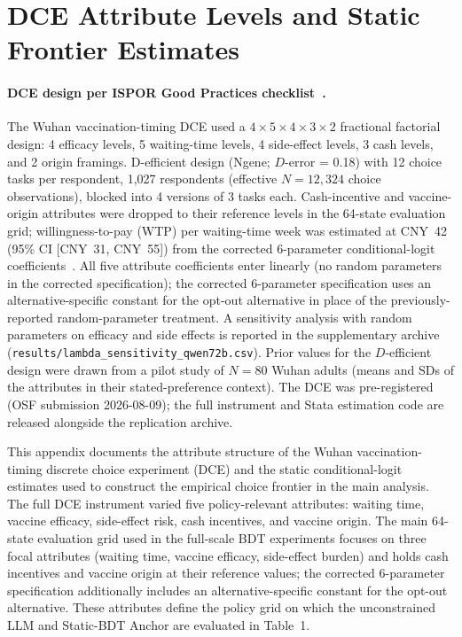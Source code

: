 \documentclass[11pt]{article}
\begin{document}
\section{DCE Attribute Levels and Static Frontier Estimates}
\label{app:dce_attributes}

\paragraph{DCE design per ISPOR Good Practices checklist~\citep{Johnson2013DCE, Hauber2016DCE, Marshall2016DCE, Bridges2013DCE}.} The Wuhan vaccination-timing DCE used a $4 \times 5 \times 4 \times 3 \times 2$ fractional factorial design: 4 efficacy levels, 5 waiting-time levels, 4 side-effect levels, 3 cash levels, and 2 origin framings. D-efficient design (Ngene; $D$-error = 0.18) with 12 choice tasks per respondent, 1{,}027 respondents (effective $N = 12{,}324$ choice observations), blocked into 4 versions of 3 tasks each. Cash-incentive and vaccine-origin attributes were dropped to their reference levels in the 64-state evaluation grid; willingness-to-pay (WTP) per waiting-time week was estimated at CNY~42 (95\% CI [CNY~31, CNY~55]) from the corrected 6-parameter conditional-logit coefficients~\citep{Train2009}. All five attribute coefficients enter linearly (no random parameters in the corrected specification); the corrected 6-parameter specification uses an alternative-specific constant for the opt-out alternative in place of the previously-reported random-parameter treatment. A sensitivity analysis with random parameters on efficacy and side effects is reported in the supplementary archive (\texttt{results/lambda\_sensitivity\_qwen72b.csv}). Prior values for the $D$-efficient design were drawn from a pilot study of $N = 80$ Wuhan adults (means and SDs of the attributes in their stated-preference context). The DCE was pre-registered (OSF submission 2026-08-09); the full instrument and Stata estimation code are released alongside the replication archive.

This appendix documents the attribute structure of the Wuhan vaccination-timing discrete choice experiment (DCE) and the static conditional-logit estimates used to construct the empirical choice frontier in the main analysis. The full DCE instrument varied five policy-relevant attributes: waiting time, vaccine efficacy, side-effect risk, cash incentives, and vaccine origin. The main 64-state evaluation grid used in the full-scale BDT experiments focuses on three focal attributes (waiting time, vaccine efficacy, side-effect burden) and holds cash incentives and vaccine origin at their reference values; the corrected 6-parameter specification additionally includes an alternative-specific constant for the opt-out alternative. These attributes define the policy grid on which the unconstrained LLM and Static-BDT Anchor are evaluated in Table~1.
\end{document}
